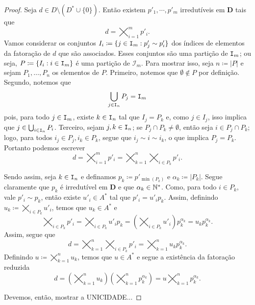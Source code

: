 \begin{proof}
	Seja $d \in D \setminus (D^* \cup \{0\})$. Então existem $p'_1,\cdots,p'_m$ irredutíveis em $\bm D$ tais que
	\begin{equation*}
	d=\bigtimes_{i=1}^m p'_i.
	\end{equation*}
Vamos considerar os conjuntos $I_i \coloneqq \{j \in \mathtt I_m : p'_j \sim p'_i\}$ dos índices de elementos da fatoração de $d$ que são associados. Esses conjuntos são uma partição de $\mathtt I_m$; ou seja, $P \coloneqq \{I_i : i \in \mathtt I_m\}$ é uma partição de $\mathcal I_m$. Para mostrar isso, seja $n \coloneqq |P|$ e sejam $P_1,\ldots,P_n$ os elementos de $P$. Primeiro, notemos que $\emptyset \notin P$ por definição. Segundo, notemos que
	\begin{equation*}
	\bigcup_{j \in \mathtt I_n} P_j = \mathtt I_m
	\end{equation*}
pois, para todo $j \in \mathtt I_m$, existe $k \in \mathtt I_n$ tal que $I_j = P_k$ e, como $j \in I_j$, isso implica que $j \in \bigcup_{i \in \mathtt I_n} P_i$. Terceiro, sejam $j,k \in \mathtt I_n$; se $P_j \cap P_k \neq \emptyset$, então seja $i \in P_j \cap P_k$; logo, para todos $i_j \in P_j,i_k \in P_k$, segue que $i_j \sim i \sim i_k$, o que implica $P_j=P_k$. Portanto podemos escrever
	\begin{equation*}
	d = \bigtimes_{i=1}^m p'_i = \bigtimes_{k=1}^n \bigtimes_{i \in P_k} p'_i.
	\end{equation*}

	Sendo assim, seja $k \in \mathtt I_n$ e definamos $p_k \coloneqq p'_{\min(P_k)}$ e $\alpha_k \coloneqq |P_k|$. Segue claramente que $p_k$ é irredutível em $\bm D$ e que $\alpha_k \in \mathbb{N}^*$. Como, para todo $i \in P_k$, vale $p'_i \sim p_k$, então existe $u'_i \in A^*$ tal que $p'_i = u'_ip_k$. Assim, definindo $u_k \coloneqq \displaystyle\bigtimes_{i \in P_k} u'_i$, temos que $u_k \in A^*$ e
	\begin{equation*}
	\bigtimes_{i \in P_k} p'_i = \bigtimes_{i \in P_k} u'_ip_k = \left( \bigtimes_{i \in P_k}u'_i \right) p_k^{\alpha_k} = u_kp_k^{\alpha_k}.
	\end{equation*}
	Assim, segue que
	\begin{equation*}
	d = \bigtimes_{k=1}^n \bigtimes_{i \in P_k} p'_i = \bigtimes_{k=1}^n u_kp_k^{\alpha_k}.
	\end{equation*}
Definindo $u \coloneqq \displaystyle\bigtimes_{k=1}^n u_k$, temos que $u \in A^*$ e segue a existência da fatoração reduzida
	\begin{equation*}
	d = \left( \bigtimes_{k=1}^n u_k \right) \left(\bigtimes_{k=1}^n p_k^{\alpha_k} \right) = u \bigtimes_{k=1}^n p_k^{\alpha_k}.
	\end{equation*}

	Devemos, então, mostrar a UNICIDADE...
\end{proof}


